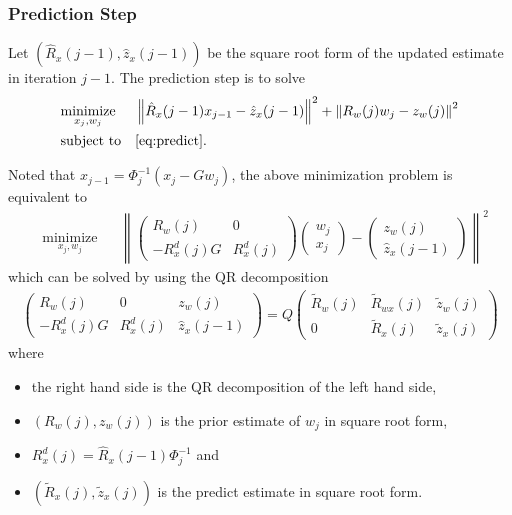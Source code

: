 \documentclass[microtype]{gtpart}     %
\theoremstyle{definition}
\newcommand{\norm}[1]{\left\lVert#1\right\rVert}
\begin{document}
\subsubsection{Prediction Step}

Let $(\hat{R}_x(j-1), \hat{z}_x(j-1))$ be the square root form of the updated estimate in iteration $j-1$.
The prediction step is to solve
\begin{align*}
	& \underset{x_j, w_j}{\text{minimize}} & &\norm{\hat{R}_x(j-1)x_{j-1} - \hat{z}_x(j-1)}^2 + \norm{R_w(j)w_j - z_w(j)}^2 \\
	& \text{subject to} & & \autoref{eq:predict}.
\end{align*}

Noted that $x_{j-1} = \Phi^{-1}_j(x_j - Gw_j)$, the above minimization problem is equivalent to
\begin{align*}
	& \underset{x_j, w_j}{\text{minimize}} & &\norm{
		\begin{pmatrix}
		R_w(j) &0 \\
		-R^d_x(j)G &R^d_x(j)
		\end{pmatrix}
		\begin{pmatrix}
		w_j \\ x_j
		\end{pmatrix} - \begin{pmatrix}
		z_w(j) \\ \hat{z}_x(j-1)
		\end{pmatrix}}^2
\end{align*}
which can be solved by using the QR decomposition
\begin{align*}
	\begin{pmatrix}
		R_w(j) &0 &z_w(j) \\ 
		-R^d_x(j)G &R^d_x(j) &\hat{z}_x(j-1)
	\end{pmatrix} = Q
	\begin{pmatrix}
		\tilde{R}_w(j) &\tilde{R}_{wx}(j) &\tilde{z}_w(j) \\ 0 &\tilde{R}_x(j) &\tilde{z}_x(j)
	\end{pmatrix}
\end{align*}
where
\begin{itemize}
	\item the right hand side is the QR decomposition of the left hand side,
	\item $(R_w(j), z_w(j))$ is the prior estimate of $w_j$ in square root form,
	\item $R^d_x(j)=\hat{R}_x(j-1)\Phi^{-1}_j$ and
	\item $(\tilde{R}_x(j), \tilde{z}_x(j))$ is the predict estimate in square root form.
\end{itemize}
\end{document}
